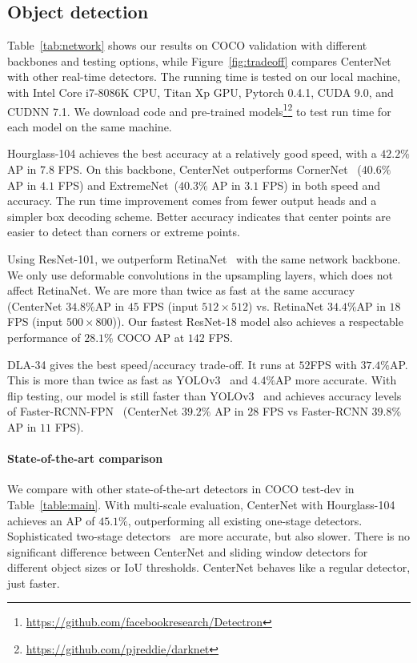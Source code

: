 \documentclass[10pt,twocolumn,letterpaper]{article}
\begin{document}
\subsection{Object detection}
Table~\ref{tab:network} shows our results on COCO validation with different backbones and testing options, while Figure~\ref{fig:tradeoff} compares CenterNet with other real-time detectors.
The running time is tested on our local machine, with Intel Core i7-8086K CPU, Titan Xp GPU, Pytorch 0.4.1, CUDA 9.0, and CUDNN 7.1.
We download code and pre-trained models\footnote{\url{https://github.com/facebookresearch/Detectron}}\footnote{\url{https://github.com/pjreddie/darknet}} to test run time for each model on the same machine.

Hourglass-104 achieves the best accuracy at a relatively good speed, with a $42.2\%$ AP in $7.8$ FPS.
On this backbone, CenterNet outperforms CornerNet~\cite{Law_2018_ECCV} ($40.6\%$ AP in $4.1$ FPS) and ExtremeNet~\cite{zhou2019bottomup}($40.3\%$ AP in $3.1$ FPS) in both speed and accuracy.
The run time improvement comes from fewer output heads and a simpler box decoding scheme.
Better accuracy indicates that center points are easier to detect than corners or extreme points.

Using ResNet-101, we outperform RetinaNet~\cite{lin2018focal} with the same network backbone.
We only use deformable convolutions in the upsampling layers, which does not affect RetinaNet.
We are more than twice as fast at the same accuracy (CenterNet $34.8\%$AP in $45$ FPS (input $512\times512$) vs. RetinaNet $34.4\%$AP in $18$ FPS (input $500\times800$)).
Our fastest ResNet-18 model also achieves a respectable performance of $28.1\%$ COCO AP at $142$ FPS.

DLA-34 gives the best speed/accuracy trade-off. 
It runs at $52 $FPS with $37.4\%$AP.
This is more than twice as fast as YOLOv3~\cite{redmon2018yolov3} and $4.4\%$AP more accurate.
With flip testing, our model is still faster than YOLOv3~\cite{redmon2018yolov3} and achieves accuracy levels of Faster-RCNN-FPN~\cite{ren2015faster} (CenterNet $39.2\%$ AP  in $28$ FPS vs Faster-RCNN $39.8\%$ AP in $11$ FPS).

\paragraph{State-of-the-art comparison}
We compare with other state-of-the-art detectors in COCO test-dev in Table~\ref{table:main}.
With multi-scale evaluation, CenterNet with Hourglass-104 achieves an AP of $45.1\%$, outperforming all existing one-stage detectors.
Sophisticated two-stage detectors~\cite{zhu2018deformable,sniper2018,liu2018path,li2019scale} are more accurate, but also slower.
There is no significant difference between CenterNet and sliding window detectors for different object sizes or IoU thresholds.
CenterNet behaves like a regular detector, just faster.
\end{document}
